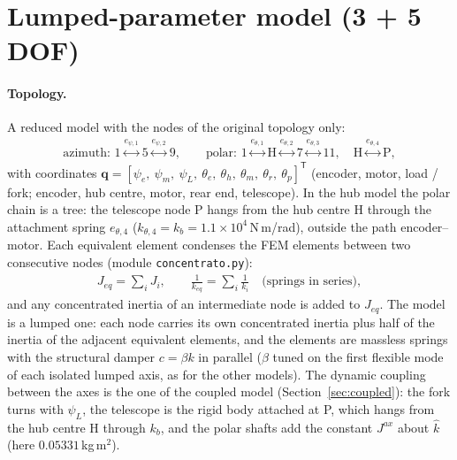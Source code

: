 \documentclass[10pt,a4paper]{article}
\numberwithin{equation}{section}
\begin{document}
\section{Lumped-parameter model (3 + 5 DOF)}\label{sec:lumped}
\paragraph{Topology.} A reduced model with the nodes of the original topology only:
\begin{gather}
\text{azimuth: } 1 \overset{e_{\psi,1}}{\longleftrightarrow} 5 \overset{e_{\psi,2}}{\longleftrightarrow} 9, \qquad \text{polar: } 1 \overset{e_{\theta,1}}{\longleftrightarrow} \mathrm H \overset{e_{\theta,2}}{\longleftrightarrow} 7 \overset{e_{\theta,3}}{\longleftrightarrow} 11,\quad \mathrm H \overset{e_{\theta,4}}{\longleftrightarrow} \mathrm P,
\end{gather}
with coordinates $\mathbf q = [\psi_e,\ \psi_m,\ \psi_L,\ \theta_e,\ \theta_h,\ \theta_m,\ \theta_r,\ \theta_p]^{\mathsf T}$ (encoder, motor, load / fork; encoder, hub centre, motor, rear end, telescope). In the hub model the polar chain is a tree: the telescope node P hangs from the hub centre H through the attachment spring $e_{\theta,4}$ ($k_{\theta,4} = k_b = 1.1\times10^{4}$\,N\,m/rad), outside the path encoder--motor. Each equivalent element condenses the FEM elements between two consecutive nodes (module \texttt{concentrato.py}):
\begin{gather}
J_{eq} = \sum_i J_i, \qquad \frac{1}{k_{eq}} = \sum_i\frac{1}{k_i}\quad\text{(springs in series)},
\end{gather}
and any concentrated inertia of an intermediate node is added to $J_{eq}$. The model is a lumped one: each node carries its own concentrated inertia plus half of the inertia of the adjacent equivalent elements, and the elements are massless springs with the structural damper $c = \beta k$ in parallel ($\beta$ tuned on the first flexible mode of each isolated lumped axis, as for the other models). The dynamic coupling between the axes is the one of the coupled model (Section~\ref{sec:coupled}): the fork turns with $\psi_L$, the telescope is the rigid body attached at P, which hangs from the hub centre H through $k_b$, and the polar shafts add the constant $J^{ax}$ about $\hat k$ (here $0.05331$\,kg\,m$^2$).
\end{document}
